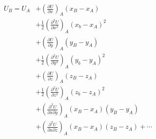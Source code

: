\begin{equation}
\begin{aligned}
U_B = U_A & + \left(\frac{\partial U}{\partial x}\right)_A (x_B - x_A) \\
    & + \frac{1}{2}\left(\frac{\partial^2 U}{\partial x^2}\right)_A (x_b - x_A)^2 \\
    & + \left(\frac{\partial U}{\partial y}\right)_A (y_B - y_A) \\
    & + \frac{1}{2}\left(\frac{\partial^2 U}{\partial y^2}\right)_A (y_b - y_A)^2 \\
    & + \left(\frac{\partial U}{\partial z}\right)_A (z_B - z_A) \\
    & + \frac{1}{2}\left(\frac{\partial^2 U}{\partial z^2}\right)_A (z_b - z_A)^2 \\
    & + \left(\frac{\partial^2 U}{\partial x \partial y}\right)_A (x_B - x_A)(y_B - y_A) \\
    & + \left(\frac{\partial^2 U}{\partial x \partial z}\right)_A (x_B - x_A)(z_B - z_A) + \cdots
\end{aligned}
\end{equation}

